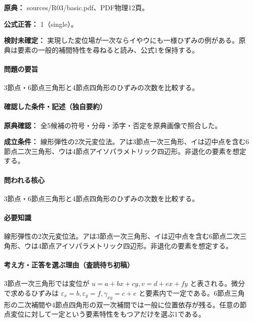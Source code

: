 \noindent\textbf{原典：} sources/R03/basic.pdf、PDF物理12頁。

\textbf{公式正答：} 1（single）。

\par\textbf{検討未確定：} 実現した変位場が一次ならイやウにも一様ひずみの例がある。原典は要素の一般的補間特性を尋ねると読み、公式1を保持する。

\paragraph{問題の要旨} 3節点・6節点三角形と4節点四角形のひずみの次数を比較する。

\paragraph{確認した条件・記述（独自要約）}\mbox{}\par

\noindent\textbf{原典確認：} 全5候補の符号・分母・添字・否定を原典画像で照合した。\par

\noindent\textbf{成立条件：} 線形弾性の2次元変位法。アは3節点一次三角形、イは辺中点を含む6節点二次三角形、ウは4節点アイソパラメトリック四辺形。非退化の要素を想定する。\par

\paragraph{問われる核心} 3節点・6節点三角形と4節点四角形のひずみの次数を比較する。

\paragraph{必要知識} 線形弾性の2次元変位法。アは3節点一次三角形、イは辺中点を含む6節点二次三角形、ウは4節点アイソパラメトリック四辺形。非退化の要素を想定する。

\paragraph{考え方・正答を選ぶ理由（査読待ち初稿）} 3節点一次三角形では変位が \(u=a+bx+cy,v=d+ex+fy\) と表される。微分で求めるひずみは \(\varepsilon_x=b,\varepsilon_y=f,\gamma_{xy}=c+e\) と要素内で一定である。6節点三角形の二次補間や4節点四角形の双一次補間では一般に位置依存が残る。任意の節点変位に対して一定という要素特性をもつアだけを選ぶ1である。

